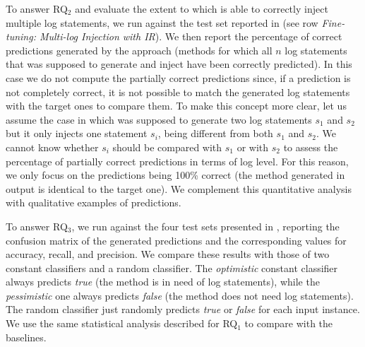 To answer RQ$_2$ and evaluate the extent to which \approach is able to correctly inject multiple log statements, we run \approach against the test set reported in  (see row \emph{Fine-tuning: Multi-log Injection with IR}). We then report the percentage of correct predictions generated by the approach (\ie methods for which all $n$ log statements that \approach was supposed to generate and inject have been correctly predicted). In this case we do not compute the partially correct predictions since, if a prediction is not completely correct, it is not possible to match the generated log statements with the target ones to compare them. To make this concept more clear, let us assume the case in which \approach was supposed to generate two log statements $s_1$ and $s_2$ but it only injects one statement $s_i$, being different from both $s_1$ and $s_2$. We cannot know whether $s_i$ should be compared with $s_1$ or with $s_2$ to assess the percentage of partially correct predictions in terms of \eg log level. For this reason, we only focus on the predictions being 100\% correct (\ie the method generated in output is identical to the target one). We complement this quantitative analysis with qualitative examples of predictions.

To answer RQ$_3$, we run \approach against the four test sets presented in , reporting the confusion matrix of the generated predictions and the corresponding values for accuracy, recall, and precision. We compare these results with those of two constant classifiers and a random classifier. The \emph{optimistic} constant classifier always predicts \emph{true} (\ie the method is in need of log statements), while the \emph{pessimistic} one always predicts \emph{false} (\ie the method does not need log statements). The random classifier just randomly predicts \emph{true} or \emph{false} for each input instance. We use the same statistical analysis described for RQ$_1$ to compare \approach with the baselines.